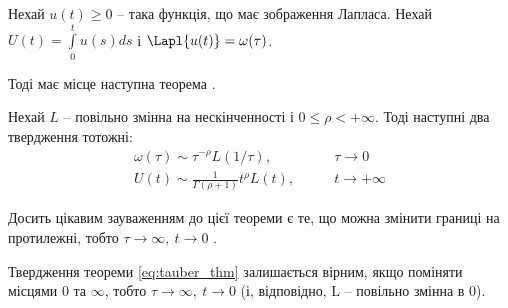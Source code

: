 Нехай $u(t) \geq 0$ – така функція, що має зображення Лапласа. Нехай $U(t)=\int\limits_0^t u(s) ds$ і $\Lapl{u(t)}=\omega(\tau)$.

Тоді має місце наступна теорема \cite[~ст. 445]{Feller}.

\begin{thm}
	\label{eq:tauber_thm}
	Нехай $L$ – повільно змінна на нескінченності і $0 ≤ \rho < +\infty$. Тоді наступні два твердження тотожні:
	\begin{align}
		\omega(\tau) \sim \tau^{-\rho} L(1/\tau),\qquad &\tau \rightarrow 0 \\
		U(t) \sim \frac{1}{\Gamma(\rho + 1)} t^{\rho} L(t),\qquad &t \rightarrow +\infty
	\end{align}
\end{thm}

Досить цікавим зауваженням до цієї теореми є те, що можна змінити границі на протилежні, тобто $\tau \rightarrow \infty, ~ t \rightarrow 0$ \cite[~ст. 445]{Feller}.

\begin{thm}
	\label{eq:tauber_rev_thm}
	Твердження теореми \eqref{eq:tauber_thm} залишається вірним, якщо поміняти місцями 0 та $\infty$, тобто $\tau \rightarrow \infty, ~ t \rightarrow 0$ (і, відповідно, L – повільно змінна в 0).
\end{thm}
